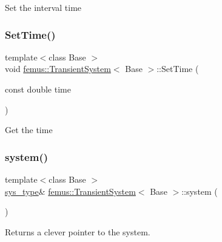 Set the interval time \mbox{\label{classfemus_1_1_transient_system_aebe52e42794030d47770098430d4533d}} 
\subsubsection{\texorpdfstring{Set\+Time()}{SetTime()}}
{\footnotesize\ttfamily template$<$class Base $>$ \\
void \mbox{\hyperlink{classfemus_1_1_transient_system}{femus\+::\+Transient\+System}}$<$ Base $>$\+::Set\+Time (\begin{DoxyParamCaption}\item[{const double}]{time }\end{DoxyParamCaption})\hspace{0.3cm}{\ttfamily [inline]}}

Get the time \mbox{\label{classfemus_1_1_transient_system_a2a1e90e75464f42cb981f0dad3038020}} 
\subsubsection{\texorpdfstring{system()}{system()}}
{\footnotesize\ttfamily template$<$class Base $>$ \\
\mbox{\hyperlink{classfemus_1_1_transient_system_ab305e3c2b57ea9f93730f7fc712b6403}{sys\+\_\+type}}\& \mbox{\hyperlink{classfemus_1_1_transient_system}{femus\+::\+Transient\+System}}$<$ Base $>$\+::system (\begin{DoxyParamCaption}{ }\end{DoxyParamCaption})\hspace{0.3cm}{\ttfamily [inline]}}

\begin{DoxyReturn}{Returns}
a clever pointer to the system. 
\end{DoxyReturn}
\mbox{\label{classfemus_1_1_transient_system_a1801793c1013f4be5761dd4a40a69bf1}} 
